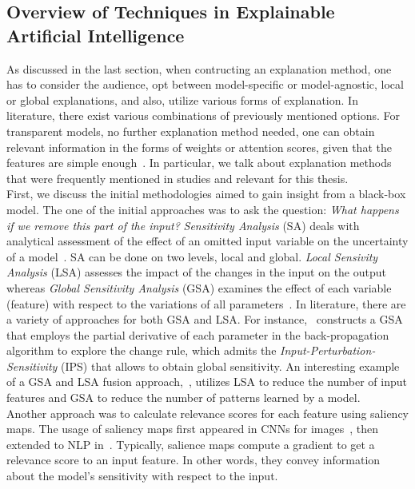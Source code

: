 \subsection{Overview of Techniques in Explainable Artificial Intelligence}
\label{subsec:explainableArtificialIntelligence_Overview}
As discussed in the last section, when contructing an explanation method, one has to consider the audience,
opt between model-specific or model-agnostic, local or global explanations, and also, utilize various forms
of explanation. In literature, there exist various combinations of previously mentioned options. For transparent models, no further explanation method needed, one can obtain relevant information in
the forms of weights or attention scores, given that the features are simple enough~\parencite{XAIConceptsTaxonomies_Arrieta}. In particular, we talk about explanation methods that were frequently mentioned
in studies and relevant for this thesis.\\
First, we discuss the initial methodologies aimed to gain insight from a black-box model. The one of the initial approaches was to ask the question: \emph{What happens if we remove this part of the input?} \emph{Sensitivity Analysis} (SA) deals with analytical assessment of the effect of an omitted input variable on the uncertainty of a model~\parencite{SensitivityAndGeneralizationInNNs_Novak}. SA can be done on two levels, local and global. \emph{Local Sensivity Analysis} (LSA) assesses the impact of the changes in the input on the output whereas \emph{Global Sensitivity Analysis} (GSA) examines the effect of each variable (feature) with respect to the variations of all parameters~\parencite{InputPerturbationSensitivity_Rao}. In literature, there are a variety of approaches for both GSA and LSA. For instance,~\cite{SensitivityAndGeneralizationInNNs_Novak} constructs a GSA that employs the partial derivative of each parameter in the back-propagation algorithm to explore the change rule, which admits the \emph{Input-Perturbation-Sensitivity} (IPS) that allows to obtain global sensitivity. An interesting example of a GSA and LSA fusion approach,~\cite{SensitivityAnalysisForPNNs_Kowalski}, utilizes LSA to reduce the number of input features and GSA to reduce the number of patterns learned by a model.\\
Another approach was to calculate relevance scores for each feature using saliency maps. The usage of saliency maps first appeared in CNNs for images~\parencite{DeepInsideCNNs_Simonyan}, then extended to NLP in~\cite{AskTheGRU_Trapit, ExtractionOfSalientSentences_Denil}. Typically, salience maps compute a gradient to get a relevance score to an input feature. In other words, they convey information about the model's sensitivity with respect to the input.\\
